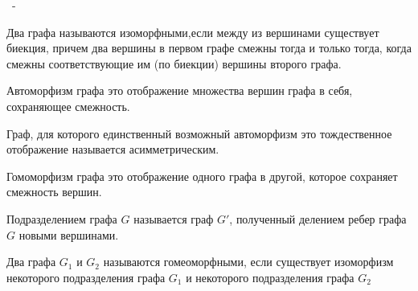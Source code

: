 ~-

\begin{definition}
  Два графа называются изоморфными,если между из вершинами существует биекция,
  причем два вершины в первом графе смежны тогда и только тогда, когда смежны
  соответствующие им (по биекции) вершины второго графа.
\end{definition}

\begin{definition}
  Автоморфизм графа это отображение множества вершин графа в себя, сохраняющее
  смежность.
\end{definition}

\begin{remark}
  Граф, для которого единственный возможный автоморфизм это тождественное
  отображение называется асимметрическим.
\end{remark}

\begin{definition}
  Гомоморфизм графа это отображение одного графа в другой, которое сохраняет
  смежность вершин.
\end{definition}

\begin{definition}
  Подразделением графа \(G\) называется граф \(G'\), полученный делением ребер
  графа \(G\) новыми вершинами.
\end{definition}

\begin{definition}
  Два графа \(G_{1}\) и \(G_{2}\) называются гомеоморфными, если существует
  изоморфизм некоторого подразделения графа \(G_{1}\) и некоторого подразделения
  графа \(G_{2}\)
\end{definition}
